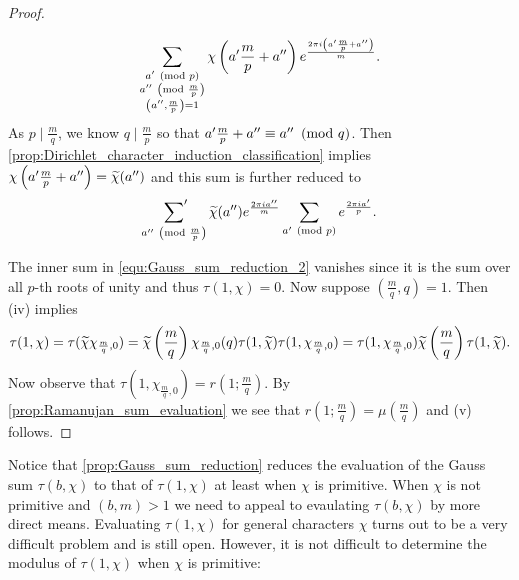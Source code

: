 \begin{proof}
\begin{enumerate}[label=(\roman*)]
\[              \sum_{\substack{a' \ \left(\text{mod }p\right) \\ a'' \ \left(\text{mod }\frac{m}{p}\right) \\ \left(a'',\frac{m}{p}\right) = 1}}\chi\left(a'\frac{m}{p}+a''\right)e^{\frac{2\pi i\left(a'\frac{m}{p}+a''\right)}{m}}.
            \]
            As $p \mid \frac{m}{q}$, we know $q \mid \frac{m}{p}$ so that $a'\frac{m}{p}+a'' \equiv a'' \ \left(\text{mod }q\right)$. Then \cref{prop:Dirichlet_character_induction_classification} implies $\chi\left(a'\frac{m}{p}+a''\right) = \widetilde{\chi}(a'')$ and this sum is further reduced to
            \begin{equation}\label{equ:Gauss_sum_reduction_2}
              \sideset{}{'}\sum_{a'' \ \left(\text{mod }\frac{m}{p}\right)}\widetilde{\chi}(a'')e^{\frac{2\pi ia''}{m}}\sum_{a' \ \left(\text{mod }p\right)}e^{\frac{2\pi ia'}{p}}.
            \end{equation}
          \end{enumerate}
          The inner sum in \cref{equ:Gauss_sum_reduction_2} vanishes since it is the sum over all $p$-th roots of unity and thus $\tau(1,\chi) = 0$. Now suppose $\left(\frac{m}{q},q\right) = 1$. Then (iv) implies
          \[
            \tau(1,\chi) = \tau(\widetilde{\chi}\chi_{\frac{m}{q},0}) = \widetilde{\chi}\left(\frac{m}{q}\right)\chi_{\frac{m}{q},0}(q)\tau(1,\widetilde{\chi})\tau(1,\chi_{\frac{m}{q},0}) = \tau(1,\chi_{\frac{m}{q},0})\widetilde{\chi}\left(\frac{m}{q}\right)\tau(1,\widetilde{\chi}).
          \]
          Now observe that $\tau(1,\chi_{\frac{m}{q},0}) = r\left(1;\frac{m}{q}\right)$. By \cref{prop:Ramanujan_sum_evaluation} we see that $r\left(1;\frac{m}{q}\right) = \mu\left(\frac{m}{q}\right)$ and (v) follows.
        \end{proof}

        Notice that \cref{prop:Gauss_sum_reduction} reduces the evaluation of the Gauss sum $\tau(b,\chi)$ to that of $\tau(1,\chi)$ at least when $\chi$ is primitive. When $\chi$ is not primitive and $(b,m) > 1$ we need to appeal to evaulating $\tau(b,\chi)$ by more direct means. Evaluating $\tau(1,\chi)$ for general characters $\chi$ turns out to be a very difficult problem and is still open. However, it is not difficult to determine the modulus of $\tau(1,\chi)$ when $\chi$ is primitive:

